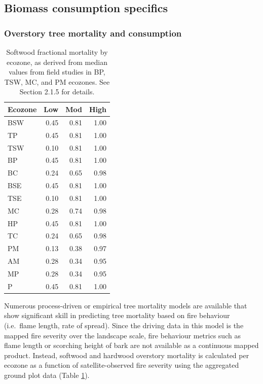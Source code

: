 \documentclass[, manuscript]{copernicus}
\begin{document}
\subsection{Biomass consumption specifics}

\subsubsection{Overstory tree mortality and consumption}

\begin{table}
\centering
\caption{\label{tab:tab-MortByEcozone}Softwood fractional mortality by ecozone, as derived from median values from field studies in BP, TSW, MC, and PM ecozones.  See Section 2.1.5 for details.}
\centering
\begin{tabular}[t]{l|r|r|r}
\hline
Ecozone & Low & Mod & High\\
\hline
BSW & 0.45 & 0.81 & 1.00\\
\hline
TP & 0.45 & 0.81 & 1.00\\
\hline
TSW & 0.10 & 0.81 & 1.00\\
\hline
BP & 0.45 & 0.81 & 1.00\\
\hline
BC & 0.24 & 0.65 & 0.98\\
\hline
BSE & 0.45 & 0.81 & 1.00\\
\hline
TSE & 0.10 & 0.81 & 1.00\\
\hline
MC & 0.28 & 0.74 & 0.98\\
\hline
HP & 0.45 & 0.81 & 1.00\\
\hline
TC & 0.24 & 0.65 & 0.98\\
\hline
PM & 0.13 & 0.38 & 0.97\\
\hline
AM & 0.28 & 0.34 & 0.95\\
\hline
MP & 0.28 & 0.34 & 0.95\\
\hline
P & 0.45 & 0.81 & 1.00\\
\hline
\end{tabular}
\end{table}

Numerous process-driven \citep{michaletz2006} or empirical
\citep{hood2017} tree mortality models are available that show
significant skill in predicting tree mortality based on fire behaviour
(i.e.~flame length, rate of spread). Since the driving data in this
model is the mapped fire severity over the landscape scale, fire
behaviour metrics such as flame length or scorching height of bark are
not available as a continuous mapped product. Instead, softwood and
hardwood overstory mortality is calculated per ecozone as a function of
satellite-observed fire severity using the aggregated ground plot data
(Table \ref{tab:tab-MortByEcozone}).
\end{document}
